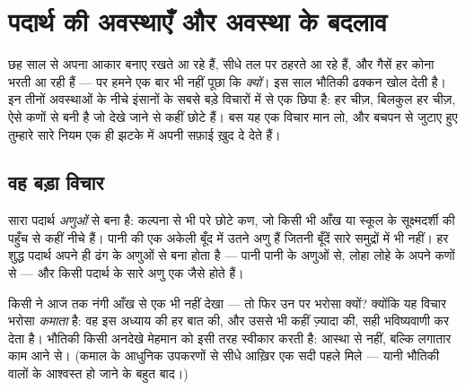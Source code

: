 \chapter{पदार्थ की अवस्थाएँ और अवस्था के बदलाव}\label{ch:g7:states-of-matter}

छह साल से  अपना आकार बनाए रखते आ रहे हैं,  सीधे तल पर ठहरते आ
रहे हैं, और गैसें हर कोना भरती आ रही हैं --- पर हमने एक बार भी नहीं
पूछा कि \emph{क्यों}। इस साल भौतिकी ढक्कन खोल देती है। इन तीनों
अवस्थाओं के नीचे इंसानों के सबसे बड़े विचारों में से एक छिपा है: हर
चीज़, बिलकुल हर चीज़, ऐसे कणों से बनी है जो देखे जाने से कहीं छोटे
हैं। बस यह एक विचार मान लो, और बचपन से जुटाए हुए तुम्हारे सारे नियम एक
ही झटके में अपनी सफ़ाई ख़ुद दे देते हैं।

\section{वह बड़ा विचार}

\begin{definition}[अणु]\label{def:g7:states-of-matter:molecule}
सारा पदार्थ \emph{अणुओं} से बना है: कल्पना से भी परे छोटे
कण, जो किसी भी आँख या स्कूल के सूक्ष्मदर्शी की पहुँच से कहीं नीचे हैं।
पानी की एक अकेली बूँद में उतने अणु हैं जितनी बूँदें सारे समुद्रों में
भी नहीं। हर शुद्ध पदार्थ अपने ही ढंग के अणुओं से बना होता है --- पानी
पानी के अणुओं से, लोहा लोहे के अपने कणों से --- और किसी पदार्थ के सारे
अणु एक जैसे होते हैं।
\end{definition}

\begin{remark}[बिना देखे मान लेना]\label{rem:g7:states-of-matter:believing}
किसी ने आज तक नंगी आँख से एक भी  नहीं देखा --- तो फिर उन पर भरोसा
क्यों? क्योंकि यह विचार भरोसा \emph{कमाता} है: वह इस अध्याय की हर बात
की, और उससे भी कहीं ज़्यादा की, सही भविष्यवाणी कर देता है। भौतिकी किसी
अनदेखे मेहमान को इसी तरह स्वीकार करती है: आस्था से नहीं, बल्कि लगातार
काम आने से। (कमाल के आधुनिक उपकरणों से सीधे  आख़िर एक सदी पहले
मिले --- यानी भौतिकी वालों के आश्वस्त हो जाने के बहुत बाद।)
\end{remark}

